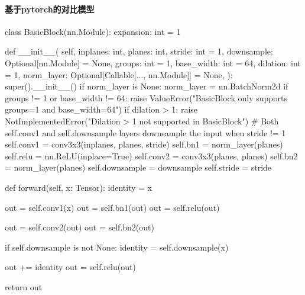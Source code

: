 \paragraph{基于pytorch的对比模型}
\begin{codeblock}[language=python]
class BasicBlock(nn.Module):
    expansion: int = 1

    def __init__(
        self,
        inplanes: int,
        planes: int,
        stride: int = 1,
        downsample: Optional[nn.Module] = None,
        groups: int = 1,
        base_width: int = 64,
        dilation: int = 1,
        norm_layer: Optional[Callable[..., nn.Module]] = None,
    ):
        super().__init__()
        if norm_layer is None:
            norm_layer = nn.BatchNorm2d
        if groups != 1 or base_width != 64:
            raise ValueError("BasicBlock only supports groups=1 and base_width=64")
        if dilation > 1:
            raise NotImplementedError("Dilation > 1 not supported in BasicBlock")
        # Both self.conv1 and self.downsample layers downsample the input when stride != 1
        self.conv1 = conv3x3(inplanes, planes, stride)
        self.bn1 = norm_layer(planes)
        self.relu = nn.ReLU(inplace=True)
        self.conv2 = conv3x3(planes, planes)
        self.bn2 = norm_layer(planes)
        self.downsample = downsample
        self.stride = stride

    def forward(self, x: Tensor):
        identity = x

        out = self.conv1(x)
        out = self.bn1(out)
        out = self.relu(out)

        out = self.conv2(out)
        out = self.bn2(out)

        if self.downsample is not None:
            identity = self.downsample(x)

        out += identity
        out = self.relu(out)

        return out

\end{codeblock}
    
    
    
